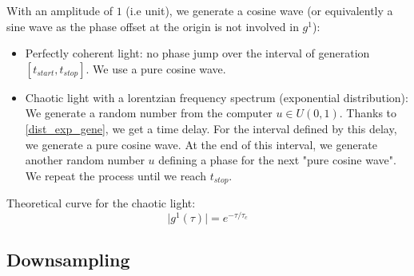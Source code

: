 \documentclass[12pt]{report}
\begin{document}
With an amplitude of $1$ (i.e unit), we generate a cosine wave (or equivalently a sine wave as the phase offset at the origin is not involved in $g^1$):
\begin{itemize}
	\item Perfectly coherent light: no phase jump over the interval of generation $\left[ t_{start}, t_{stop} \right]$. We use a pure cosine wave.
	\item Chaotic light with a lorentzian frequency spectrum (exponential distribution): We generate a random number from the computer $u \in U(0,1)$. Thanks to \eqref{dist_exp_gene}, we get a time delay. For the interval defined by this delay, we generate a pure cosine wave. At the end of this interval, we generate another random number $u$ defining a phase for the next "pure cosine wave". We repeat the process until we reach $t_{stop}$.
\end{itemize}

Theoretical curve for the chaotic light:
\begin{equation}
\vert g^1(\tau) \vert = e^{-\tau/\tau_c}
\end{equation}

\subsection{Downsampling}
\end{document}
